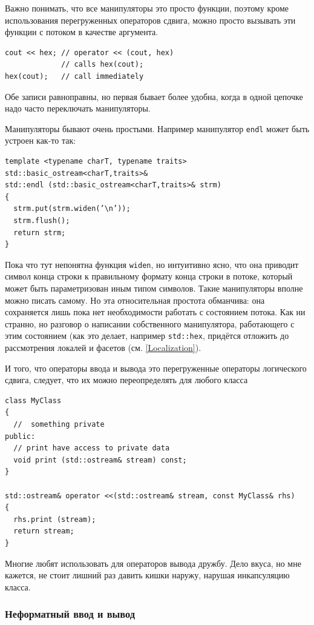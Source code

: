 \documentclass[a4paper,12pt,oneside]{article}
\begin{document}
Важно понимать, что все манипуляторы это просто функции, поэтому кроме использования перегруженных операторов сдвига, можно просто вызывать эти функции с потоком в качестве аргумента.

\begin{lstlisting}
cout << hex; // operator << (cout, hex)
             // calls hex(cout);
hex(cout);   // call immediately
\end{lstlisting}

Обе записи равноправны, но первая бывает более удобна, когда в одной цепочке надо часто переключать манипуляторы.

Манипуляторы бывают очень простыми. Например манипулятор \lstinline!endl! может быть устроен как-то так:

\begin{lstlisting}
template <typename charT, typename traits>
std::basic_ostream<charT,traits>&
std::endl (std::basic_ostream<charT,traits>& strm)
{
  strm.put(strm.widen(’\n’));
  strm.flush();
  return strm;
}
\end{lstlisting}

Пока что тут непонятна функция \lstinline!widen!, но интуитивно ясно, что она приводит символ конца строки к правильному формату конца строки в потоке, который может быть параметризован иным типом символов. Такие манипуляторы вполне можно писать самому. Но эта относительная простота обманчива: она сохраняется лишь пока нет необходимости работать с состоянием потока. Как ни странно, но разговор о написании собственного манипулятора, работающего с этим состоянием (как это делает, например \lstinline!std::hex!, придётся отложить до рассмотрения локалей и фасетов (см. \ref{Localization}).

И того, что операторы ввода и вывода это перегруженные операторы логического сдвига, следует, что их можно переопределять для любого класса

\begin{lstlisting}
class MyClass
{
  //  something private
public:
  // print have access to private data
  void print (std::ostream& stream) const; 
}

std::ostream& operator <<(std::ostream& stream, const MyClass& rhs) 
{
  rhs.print (stream);
  return stream;
}
\end{lstlisting}

Многие любят использовать для операторов вывода дружбу. Дело вкуса, но мне кажется, не стоит лишний раз давить кишки наружу, нарушая инкапсуляцию класса.

\subsubsection{Неформатный ввод и вывод}
\end{document}
